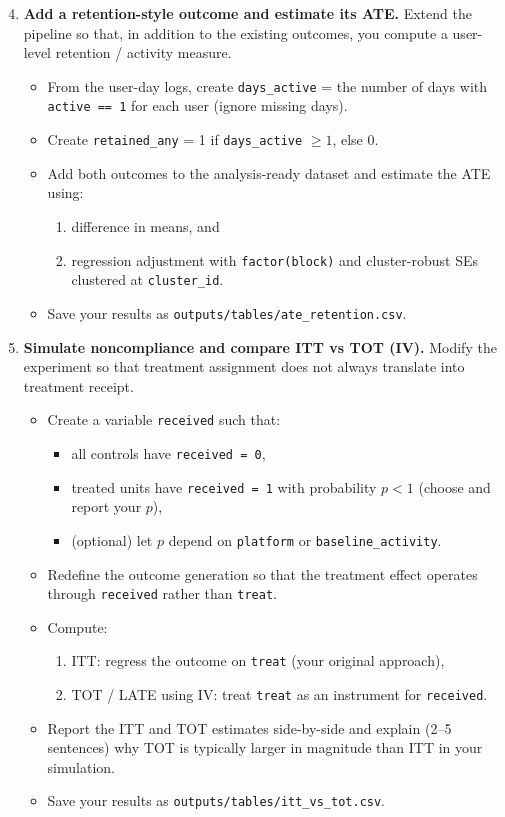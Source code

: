 \documentclass[11pt]{article}
\begin{document}
\begin{enumerate}
\setcounter{enumi}{3}

\item \textbf{Add a retention-style outcome and estimate its ATE.}
Extend the pipeline so that, in addition to the existing outcomes, you compute a user-level retention / activity measure.
\begin{itemize}
  \item From the user-day logs, create \texttt{days\_active} = the number of days with \texttt{active == 1} for each user (ignore missing days).
  \item Create \texttt{retained\_any} = 1 if \texttt{days\_active} $\ge 1$, else 0.
  \item Add both outcomes to the analysis-ready dataset and estimate the ATE using:
    \begin{enumerate}
      \item difference in means, and
      \item regression adjustment with \texttt{factor(block)} and cluster-robust SEs clustered at \texttt{cluster\_id}.
    \end{enumerate}
  \item Save your results as \texttt{outputs/tables/ate\_retention.csv}.
\end{itemize}

\item \textbf{Simulate noncompliance and compare ITT vs TOT (IV).}
Modify the experiment so that treatment assignment does not always translate into treatment receipt.
\begin{itemize}
  \item Create a variable \texttt{received} such that:
    \begin{itemize}
      \item all controls have \texttt{received = 0},
      \item treated units have \texttt{received = 1} with probability $p < 1$ (choose and report your $p$),
      \item (optional) let $p$ depend on \texttt{platform} or \texttt{baseline\_activity}.
    \end{itemize}
  \item Redefine the outcome generation so that the treatment effect operates through \texttt{received} rather than \texttt{treat}.
  \item Compute:
    \begin{enumerate}
      \item ITT: regress the outcome on \texttt{treat} (your original approach),
      \item TOT / LATE using IV: treat \texttt{treat} as an instrument for \texttt{received}.
    \end{enumerate}
  \item Report the ITT and TOT estimates side-by-side and explain (2--5 sentences) why TOT is typically larger in magnitude than ITT in your simulation.
  \item Save your results as \texttt{outputs/tables/itt\_vs\_tot.csv}.
\end{itemize}


\end{enumerate}
\end{document}
